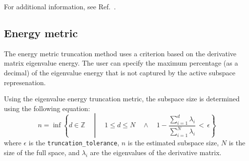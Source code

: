 For additional information, see Ref.~\cite{bing-li}.

\subsection{Energy metric}\label{SubSec:energy}
The energy metric truncation method uses a criterion based on the derivative matrix
eigenvalue energy. The user can specify the maximum percentage (as a decimal) of
the eigenvalue energy that is not captured by the active subspace represenation.

Using the eigenvalue energy truncation metric, the subspace size is determined using the following equation:
$$n = \inf \left\lbrace d \in \mathbb{Z} \quad\middle|\quad 1 \le d \le N \quad \wedge\quad 1 - \frac{\sum_{i = 1}^{d} \lambda_i}{\sum_{i = 1}^{N} \lambda_i} \,<\, \epsilon \right\rbrace $$
where $\epsilon$ is the \texttt{truncation\_tolerance}, $n$ is the estimated subspace size, $N$ is the size of the full space, and $\lambda_i$ are the eigenvalues of the derivative matrix.
